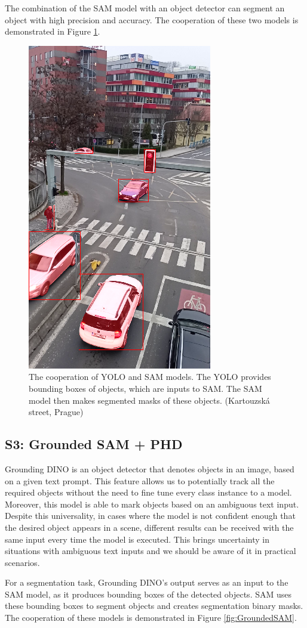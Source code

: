 The combination of the SAM model with an object detector can segment an object with high precision and accuracy.
The cooperation of these two models is demonstrated in Figure \ref{fig:yolo_sam_seg}.
\begin{figure}[h!t]
  \centering
  \includegraphics[width=0.35\linewidth]{text/chapter_04/imgs/YOLO_SAM_02}
  \caption{The cooperation of YOLO and SAM models. The YOLO provides bounding boxes of objects, which are inputs to
  SAM. The SAM model then makes segmented masks of these objects. (Kartouzská street, Prague)}
  \label{fig:yolo_sam_seg}
\end{figure}

\subsection{S3: Grounded SAM + PHD}
Grounding DINO is an object detector that denotes objects in an image, based on a given text prompt. This feature
allows us to potentially track all the required objects without the need to fine tune every class instance to a model.
Moreover, this
model is able to mark objects based on an ambiguous text input. Despite this universality,
in cases where the
model is not confident enough that the desired object appears in a scene, different results can be received with
the same input every time the model is executed. This brings uncertainty in situations with ambiguous text inputs
and we should be aware of it in practical scenarios.

For a segmentation task, Grounding DINO's output serves as an input to the SAM model, as it produces bounding boxes
of the
detected objects.
SAM uses these bounding boxes to segment objects and creates segmentation binary masks. The cooperation of these models is demonstrated in Figure \ref{fig:GroundedSAM}.

